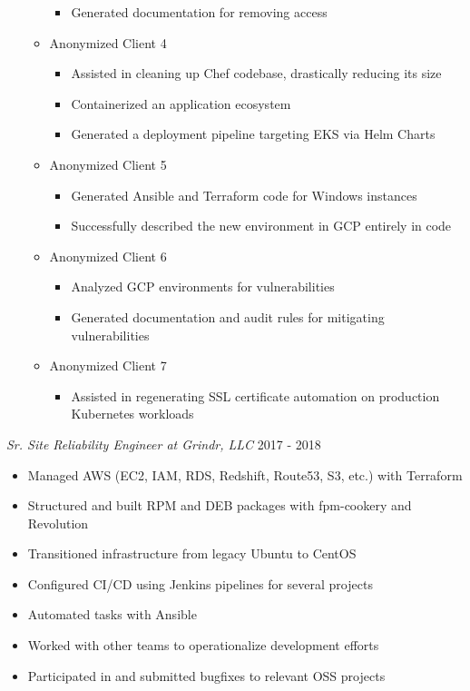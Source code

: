 \documentclass[line]{docs/resume/res}
\begin{document}
\begin{resume}
\begin{itemize}
\begin{itemize}
\begin{itemize}
        \item Generated documentation for removing access
      \end{itemize}
      \item Anonymized Client 4
      \begin{itemize} \itemsep -2pt
        \item Assisted in cleaning up Chef codebase, drastically reducing its size
        \item Containerized an application ecosystem
        \item Generated a deployment pipeline targeting EKS via Helm Charts
      \end{itemize}
      \item Anonymized Client 5
      \begin{itemize} \itemsep -2pt
        \item Generated Ansible and Terraform code for Windows instances
        \item Successfully described the new environment in GCP entirely in code
      \end{itemize}
      \item Anonymized Client 6
      \begin{itemize} \itemsep -2pt
        \item Analyzed GCP environments for vulnerabilities
        \item Generated documentation and audit rules for mitigating vulnerabilities
      \end{itemize}
      \item Anonymized Client 7
      \begin{itemize} \itemsep -2pt
        \item Assisted in regenerating SSL certificate automation on production \\
          Kubernetes workloads
      \end{itemize}
    \end{itemize}
  \end{itemize}

  {\sl Sr. Site Reliability Engineer at Grindr, LLC} \hfill 2017 - 2018
  \begin{itemize} \itemsep -2pt %
    \item Managed AWS (EC2, IAM, RDS, Redshift, Route53, S3, etc.) with Terraform
    \item Structured and built RPM and DEB packages with fpm-cookery and Revolution
    \item Transitioned infrastructure from legacy Ubuntu to CentOS
    \item Configured CI/CD using Jenkins pipelines for several projects
    \item Automated tasks with Ansible
    \item Worked with other teams to operationalize development efforts
    \item Participated in and submitted bugfixes to relevant OSS projects
  \end{itemize}


\end{resume}
\end{document}

